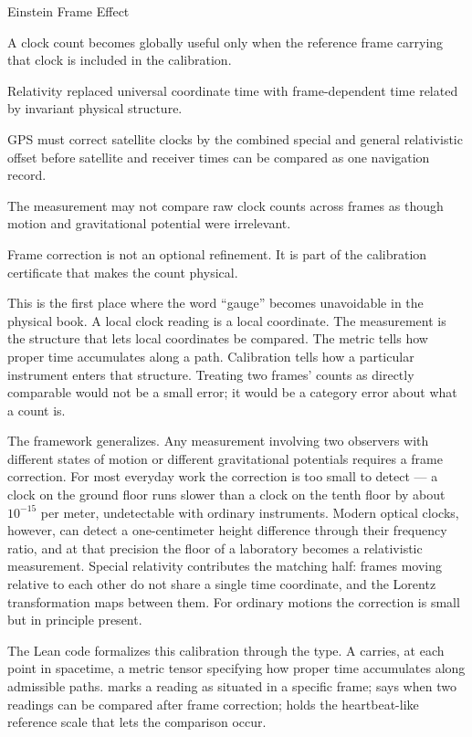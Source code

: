 \begin{phenom}{Einstein Frame Effect}
\label{ph:einstein-frame-effect}

\PhStatement A clock count becomes globally useful only when the reference
frame carrying that clock is included in the calibration.

\PhOrigin Relativity replaced universal coordinate time with frame-dependent
time related by invariant physical structure.

\PhObservation GPS must correct satellite clocks by the combined special and
general relativistic offset before satellite and receiver times can be compared
as one navigation record.

\PhConstraint The measurement may not compare raw clock counts across frames as
though motion and gravitational potential were irrelevant.

\PhConsequence Frame correction is not an optional refinement. It is part of
the calibration certificate that makes the count physical.

\end{phenom}

This is the first place where the word ``gauge'' becomes unavoidable in the
physical book. A local clock reading is a local coordinate. The measurement
is the structure that lets local coordinates be compared. The metric tells
how proper time accumulates along a path. Calibration tells how a particular
instrument enters that structure. Treating two frames' counts as directly
comparable would not be a small error; it would be a category error about
what a count is.

The framework generalizes. Any measurement involving two observers with
different states of motion or different gravitational potentials requires
a frame correction. For most everyday work the correction is too small to
detect --- a clock on the ground floor runs slower than a clock on the tenth
floor by about $10^{-15}$ per meter, undetectable with ordinary instruments.
Modern optical clocks, however, can detect a one-centimeter height difference
through their frequency ratio, and at that precision the floor of a laboratory
becomes a relativistic measurement. Special relativity contributes the
matching half: frames moving relative to each other do not share a single
time coordinate, and the Lorentz transformation maps between them. For
ordinary motions the correction is small but in principle present.

The Lean code formalizes this calibration through the 
type. A  carries, at each point in spacetime, a metric
tensor specifying how proper time accumulates along admissible paths.
 marks a reading as situated in a specific frame; 
says when two  readings can be compared after frame correction;
 holds the heartbeat-like reference scale that lets the comparison
occur.

